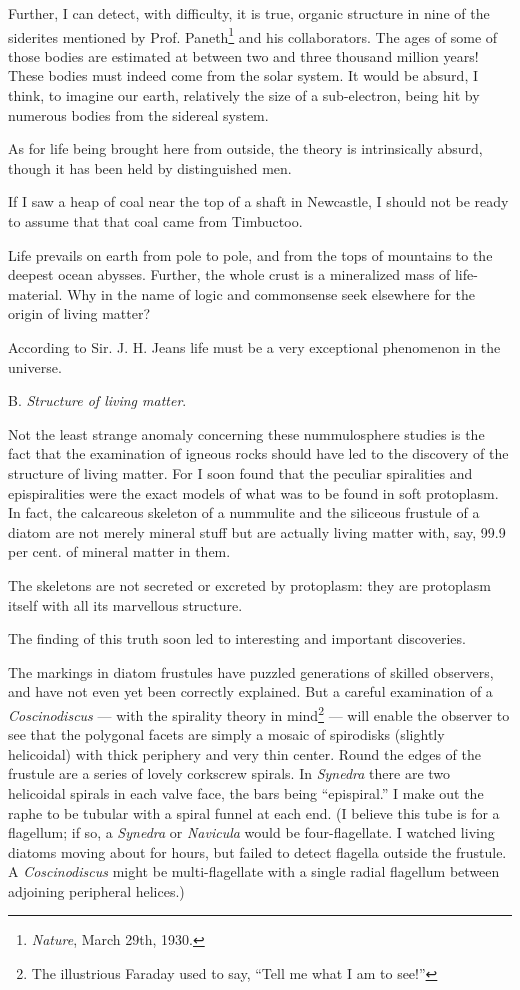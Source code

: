 \documentclass[a4paper, 12pt, oneside]{article}
\begin{document}
Further, I can detect, with difficulty, it is true, organic structure in nine of the siderites mentioned by Prof. Paneth\footnote{\emph{Nature}, March 29th, 1930.} and his collaborators. The ages of some of those bodies are estimated at between two and three thousand million years! These bodies must indeed come from the solar system. It would be absurd, I think, to imagine our earth, relatively the size of a sub-electron, being hit by numerous bodies from the sidereal system.

As for life being brought here from outside, the theory is intrinsically absurd, though it has been held by distinguished men.

If I saw a heap of coal near the top of a shaft in Newcastle, I should not be ready to assume that that coal came from Timbuctoo.

Life prevails on earth from pole to pole, and from the tops of mountains to the deepest ocean abysses. Further, the whole crust is a mineralized mass of life-material. Why in the name of logic and commonsense seek elsewhere for the origin of living matter?

According to Sir. J. H. Jeans life must be a very exceptional phenomenon in the universe.

\centerline{B. \emph{Structure of living matter}.}

Not the least strange anomaly concerning these nummulosphere studies is the fact that the examination of igneous rocks should have led to the discovery of the structure of living matter. For I soon found that the peculiar spiralities and epispiralities were the exact models of what was to be found in soft protoplasm. In fact, the calcareous skeleton of a nummulite and the siliceous frustule of a diatom are not merely mineral stuff but are actually living matter with, say, 99.9 per cent. of mineral matter in them.

The skeletons are not secreted or excreted by protoplasm: they are protoplasm itself with all its marvellous structure.

The finding of this truth soon led to interesting and important discoveries.

The markings in diatom frustules have puzzled generations of skilled observers, and have not even yet been correctly explained. But a careful examination of a \emph{Coscinodiscus} --- with the spirality theory in mind\footnote{The illustrious Faraday used to say, ``Tell me what I am to see!''} --- will enable the observer to see that the polygonal facets are simply a mosaic of spirodisks (slightly helicoidal) with thick periphery and very thin center. Round the edges of the frustule are a series of lovely corkscrew spirals. In \emph{Synedra} there are two helicoidal spirals in each valve face, the bars being ``epispiral.'' I make out the raphe to be tubular with a spiral funnel at each end. (I believe this tube is for a flagellum; if so, a \emph{Synedra} or \emph{Navicula} would be four-flagellate. I watched living diatoms moving about for hours, but failed to detect flagella outside the frustule. A \emph{Coscinodiscus} might be multi-flagellate with a single radial flagellum between adjoining peripheral helices.)
\end{document}
